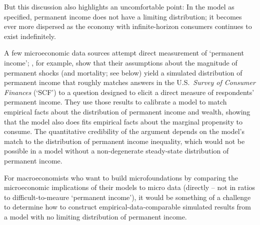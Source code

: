 \documentclass[BufferStockTheory]{subfiles}
\begin{document}
But this discussion also highlights an uncomfortable point: In the model as specified, permanent income does not have a limiting distribution; it becomes ever more dispersed as the economy with infinite-horizon consumers continues to exist indefinitely.

A few microeconomic data sources attempt direct measurement of `permanent income'; \cite{cstwMPC}, for example, show that their assumptions about the magnitude of permanent shocks (and mortality; see below) yield a simulated distribution of permanent income that roughly matches answers in the U.S.\ \emph{Survey of Consumer Finances} (`SCF') to a question designed to elicit a direct measure of respondents' permanent income.
They use those results to calibrate a model to match empirical facts about the distribution of permanent income and wealth, showing that the model also does fits empirical facts about the marginal propensity to consume.
The quantitative credibility of the argument depends on the model's match to the distribution of permanent income inequality, which would not be possible in a model without a non-degenerate steady-state distribution of permanent income.

For macroeconomists who want to build microfoundations by comparing the microeconomic implications of their models to micro data (directly -- not in ratios to difficult-to-meaure `permanent income'), it would be something of a challenge to determine how to construct empirical-data-comparable simulated results from a model with no limiting distribution of permanent income.

\begin{comment}
  \hypertarget{Consumption-and-Income-Growth-at-the-Household-Level}{}
  \subsection{Identical Growth in Income, Consumption, and Wealth}\label{subsec:cGroEqPermGroFacIndQ}

  Unfortunately, the \hyperlink{GICMod}{strong growth impatience} condition that we imposed which yielded all of these intuitive propositions at once is rather restrictive.
Modeling experience indicates that it is not always possible to find plausible combinations of parameter values that satisfy that condition.
Furthermore, while the {\GICRaw} is a considerably looser condition, as noted above (and as

\end{comment}
\end{document}
